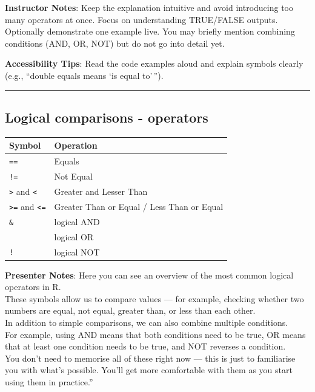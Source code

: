\documentclass[
  letterpaper,
  DIV=11,
  numbers=noendperiod]{scrartcl}
\newcounter{none} %
\begin{document}
\textbf{Instructor Notes}: Keep the explanation intuitive and avoid
introducing too many operators at once. Focus on understanding
TRUE/FALSE outputs. Optionally demonstrate one example live. You may
briefly mention combining conditions (AND, OR, NOT) but do not go into
detail yet.

\textbf{Accessibility Tips}: Read the code examples aloud and explain
symbols clearly (e.g., ``double equals means `is equal to'\,'').

\begin{center}\rule{0.5\linewidth}{0.5pt}\end{center}

\subsection{Logical comparisons -
operators}\label{logical-comparisons---operators}

{\def\LTcaptype{none} %
\begin{longtable}[]{@{}ll@{}}
\toprule\noalign{}
Symbol & Operation \\
\midrule\noalign{}
\endhead
\bottomrule\noalign{}
\endlastfoot
\texttt{==} & Equals \\
\texttt{!=} & Not Equal \\
\texttt{\textgreater{}} and \texttt{\textless{}} & Greater and Lesser
Than \\
\texttt{\textgreater{}=} and \texttt{\textless{}=} & Greater Than or
Equal / Less Than or Equal \\
\texttt{\&} & logical AND \\
\texttt{\textbar{}} & logical OR \\
\texttt{!} & logical NOT \\
\end{longtable}
}

\textbf{Presenter Notes}: Here you can see an overview of the most
common logical operators in R.\\
These symbols allow us to compare values --- for example, checking
whether two numbers are equal, not equal, greater than, or less than
each other.\\
In addition to simple comparisons, we can also combine multiple
conditions.\\
For example, using AND means that both conditions need to be true, OR
means that at least one condition needs to be true, and NOT reverses a
condition.\\
You don't need to memorise all of these right now --- this is just to
familiarise you with what's possible. You'll get more comfortable with
them as you start using them in practice.''
\end{document}
